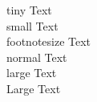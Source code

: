 \documentclass{article}  %
\begin{document}
 
 
{\tiny tiny Text }\\
{\small small Text }\\
{\footnotesize footnotesize Text }\\
{\normalsize normal Text }\\
{\large large Text }\\
{\Large Large Text }\\
\end{document}
